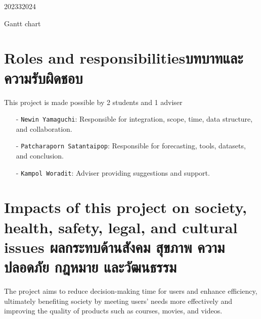 \begin{table}[H]
\begin{plan}{6}{2023}{3}{2024}
\end{plan}
\caption{Gantt chart}
\end{table}

\section{\ifenglish Roles and responsibilities\else บทบาทและความรับผิดชอบ\fi}
This project is made possible by 2 students and 1 adviser

\begin{itemize}
    \item[-] \texttt{Newin Yamaguchi}\textsf{: Responsible for integration, scope, time, data structure, and collaboration.}
    \item[-] \texttt{Patcharaporn Satantaipop}\textsf{: Responsible for forecasting, tools, datasets, and conclusion.}
    \item[-] \texttt{Kampol Woradit}\textsf{: Adviser providing suggestions and support.}
\end{itemize}

\section{\ifenglish%
Impacts of this project on society, health, safety, legal, and cultural issues
\else%
ผลกระทบด้านสังคม สุขภาพ ความปลอดภัย กฎหมาย และวัฒนธรรม
\fi}

The project aims to reduce decision-making time for users and enhance efficiency, 
ultimately benefiting society by meeting users' needs more effectively and improving 
the quality of products such as courses, movies, and videos.